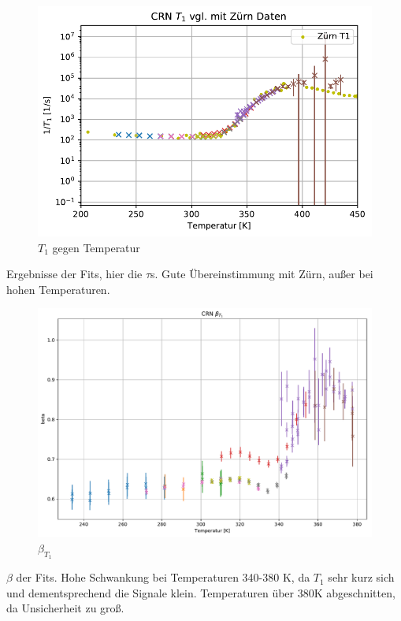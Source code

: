 \begin{figure}
	\begin{center}
		\includegraphics[width=\textwidth]{graphics/plots/T1/t1.pdf}
	\end{center}
	\caption{$T_1$ gegen Temperatur} \label{fig:res:T_1}
\end{figure}
Ergebnisse der Fits, hier die $\tau$s. Gute Übereinstimmung mit Zürn, außer bei hohen Temperaturen.

\begin{figure}
	\begin{center}
		\includegraphics[width=\textwidth]{graphics/plots/T1/t1_beta.pdf}
	\end{center}
	\caption{$\beta_{T_1}$} \label{fig:res:beta_T_1}
\end{figure}
$\beta$ der Fits. Hohe Schwankung bei Temperaturen 340-380 K, da $T_1$ sehr kurz sich und dementsprechend die Signale klein. Temperaturen über 380K abgeschnitten, da Unsicherheit zu groß.


